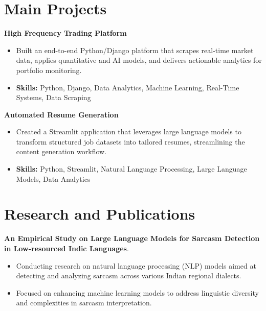 \documentclass[a4paper,11pt]{article}
\begin{document}
\section{\textbf{Main Projects}}

\vspace{1mm}
  \textbf{High Frequency Trading Platform  }
\vspace{-1.5mm} %
\begin{itemize}
  \item Built an end-to-end Python/Django platform that scrapes real-time market data, applies quantitative and AI models, and delivers actionable analytics for portfolio monitoring.
\vspace{-3mm}
  \item \textbf{Skills:} Python, Django, Data Analytics, Machine Learning, Real-Time Systems, Data Scraping
\end{itemize}


\vspace{1mm}
   \textbf{Automated Resume Generation }
\vspace{-1.5mm} %
\begin{itemize}
  \item Created a Streamlit application that leverages large language models to transform structured job datasets into tailored resumes, streamlining the content generation workflow.
\vspace{-3mm}
  \item \textbf{Skills:} Python, Streamlit, Natural Language Processing, Large Language Models, Data Analytics
\end{itemize}



\section{\textbf{Research and Publications} \hfill }
\vspace{1mm}
  \textbf{An Empirical Study on Large Language Models for Sarcasm Detection in Low-resourced Indic Languages}.
\vspace{-1mm} %
\begin{itemize}
  \item Conducting research on natural language processing (NLP) models aimed at detecting and analyzing sarcasm across various Indian regional dialects.
\vspace{-3mm}
  \item Focused on enhancing machine learning models to address linguistic diversity and complexities in sarcasm interpretation.
\end{itemize}
\end{document}
